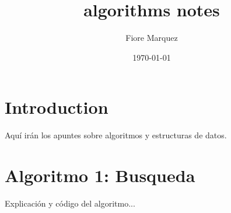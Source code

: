 \documentclass{article}
\title{algorithms notes}
\author{Fiore Marquez}
\date{\today}
\begin{document}
\maketitle

\section{Introduction}
Aquí irán los apuntes sobre algoritmos y estructuras de datos.

\section{Algoritmo 1: Busqueda}
Explicación y código del algoritmo...
\end{document}
